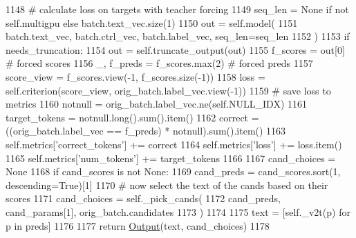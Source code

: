 \begin{DoxyCode}
1148             \textcolor{comment}{# calculate loss on targets with teacher forcing}
1149             seq\_len = \textcolor{keywordtype}{None} \textcolor{keywordflow}{if} \textcolor{keywordflow}{not} self.multigpu \textcolor{keywordflow}{else} batch.text\_vec.size(1)
1150             out = self.model(
1151                 batch.text\_vec, batch.ctrl\_vec, batch.label\_vec, seq\_len=seq\_len
1152             )
1153             \textcolor{keywordflow}{if} needs\_truncation:
1154                 out = self.truncate\_output(out)
1155             f\_scores = out[0]  \textcolor{comment}{# forced scores}
1156             \_, f\_preds = f\_scores.max(2)  \textcolor{comment}{# forced preds}
1157             score\_view = f\_scores.view(-1, f\_scores.size(-1))
1158             loss = self.criterion(score\_view, orig\_batch.label\_vec.view(-1))
1159             \textcolor{comment}{# save loss to metrics}
1160             notnull = orig\_batch.label\_vec.ne(self.NULL\_IDX)
1161             target\_tokens = notnull.long().sum().item()
1162             correct = ((orig\_batch.label\_vec == f\_preds) * notnull).sum().item()
1163             self.metrics[\textcolor{stringliteral}{'correct\_tokens'}] += correct
1164             self.metrics[\textcolor{stringliteral}{'loss'}] += loss.item()
1165             self.metrics[\textcolor{stringliteral}{'num\_tokens'}] += target\_tokens
1166 
1167         cand\_choices = \textcolor{keywordtype}{None}
1168         \textcolor{keywordflow}{if} cand\_scores \textcolor{keywordflow}{is} \textcolor{keywordflow}{not} \textcolor{keywordtype}{None}:
1169             cand\_preds = cand\_scores.sort(1, descending=\textcolor{keyword}{True})[1]
1170             \textcolor{comment}{# now select the text of the cands based on their scores}
1171             cand\_choices = self.\_pick\_cands(
1172                 cand\_preds, cand\_params[1], orig\_batch.candidates
1173             )
1174 
1175         text = [self.\_v2t(p) \textcolor{keywordflow}{for} p \textcolor{keywordflow}{in} preds]
1176 
1177         \textcolor{keywordflow}{return} \hyperlink{namespaceparlai_1_1agents_1_1legacy__agents_1_1seq2seq_1_1torch__agent__v1_a2689006ea97d09413fb242f984bd8016}{Output}(text, cand\_choices)
1178 
\end{DoxyCode}
\mbox{\label{classprojects_1_1controllable__dialogue_1_1controllable__seq2seq_1_1controllable__seq2seq_1_1ControllableSeq2seqAgent_a836e91446f995a74cce113051991711a}} 
